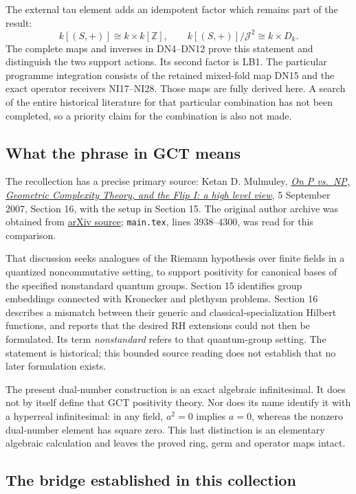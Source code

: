 \documentclass[
]{article}
\begin{document}
The external tau element adds an idempotent factor which remains part of
the result: \[
k[(S,+)]\cong k\times k[\mathbb Z],\qquad
k[(S,+)]/\mathcal J^2\cong k\times D_k.
\tag{LB2}
\] The complete maps and inverses in DN4--DN12 prove this statement and
distinguish the two support actions. Its second factor is LB1. The
particular programme integration consists of the retained mixed-fold map
DN15 and the exact operator receivers NI17--NI28. Those maps are fully
derived here. A search of the entire historical literature for that
particular combination has not been completed, so a priority claim for
the combination is also not made.

\subsection{What the phrase in GCT
means}\label{what-the-phrase-in-gct-means}

The recollection has a precise primary source: Ketan D. Mulmuley,
\href{https://arxiv.org/abs/0709.0748v1}{\emph{On P vs.~NP, Geometric
Complexity Theory, and the Flip I: a high level view}}, 5 September
2007, Section 16, with the setup in Section 15. The original author
archive was obtained from \href{https://arxiv.org/src/0709.0748v1}{arXiv
source}; \texttt{main.tex}, lines 3938--4300, was read for this
comparison.

That discussion seeks analogues of the Riemann hypothesis over finite
fields in a quantized noncommutative setting, to support positivity for
canonical bases of the specified nonstandard quantum groups. Section 15
identifies group embeddings connected with Kronecker and plethysm
problems. Section 16 describes a mismatch between their generic and
classical-specialization Hilbert functions, and reports that the desired
RH extensions could not then be formulated. Its term \emph{nonstandard}
refers to that quantum-group setting. The statement is historical; this
bounded source reading does not establish that no later formulation
exists.

The present dual-number construction is an exact algebraic
infinitesimal. It does not by itself define that GCT positivity theory.
Nor does its name identify it with a hyperreal infinitesimal: in any
field, \(a^2=0\) implies \(a=0\), whereas the nonzero dual-number
element has square zero. This last distinction is an elementary
algebraic calculation and leaves the proved ring, germ and operator maps
intact.

\subsection{The bridge established in this
collection}\label{the-bridge-established-in-this-collection}
\end{document}
